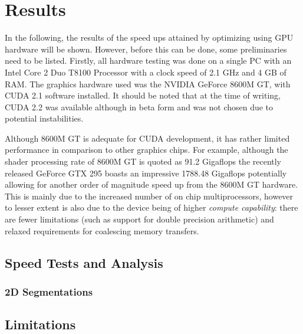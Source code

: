 \chapter{Results}

In the following, the results of the speed ups attained by optimizing using GPU hardware will be shown. However, before this can be done, some preliminaries need to be listed. Firstly, all hardware testing was done on a single PC with an Intel Core 2 Duo T8100 Processor with a clock speed of 2.1 GHz and 4 GB of RAM. The graphics hardware used was the NVIDIA GeForce 8600M GT, with CUDA 2.1 software installed. It should be noted that at the time of writing, CUDA 2.2 was available although in beta form and was not chosen due to potential instabilities. 

Although 8600M GT is adequate for CUDA development, it has rather limited performance in comparison to other graphics chips. For example, although the shader processing rate of 8600M GT is quoted as 91.2 Gigaflops the recently released GeForce GTX 295 boasts an impressive 1788.48 Gigaflops potentially allowing for another order of magnitude speed up from the 8600M GT hardware. This is mainly due to the increased number of on chip multiprocessors, however to lesser extent is also due to the device being of higher \textit{compute capability}: there are fewer limitations (such as support for double precision arithmetic) and relaxed requirements for coalescing memory transfers.

\section{Speed Tests and Analysis}\label{results}

\subsection{2D Segmentations}


	

\section{Limitations}
	
